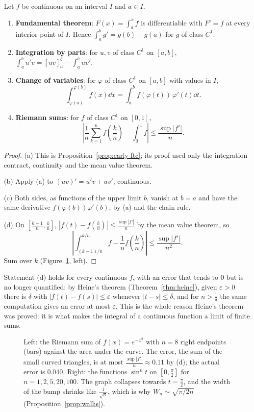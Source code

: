 \begin{proposition}\label{prop:inttools}
Let $f$ be continuous on an interval $I$ and $a\in I$.
\begin{enumerate}[label=(\alph*)]
\item \textbf{Fundamental theorem}: $F(x)=\int_a^xf$ is differentiable with $F'=f$ at every interior point of $I$. Hence $\int_a^bg'=g(b)-g(a)$ for $g$ of class $C^1$.
\item \textbf{Integration by parts}: for $u,v$ of class $C^1$ on $[a,b]$, $\int_a^bu'v=[uv]_a^b-\int_a^buv'$.
\item \textbf{Change of variables}: for $\varphi$ of class $C^1$ on $[a,b]$ with values in $I$,
\[\int_{\varphi(a)}^{\varphi(b)}f(x)\dd x=\int_a^bf(\varphi(t))\,\varphi'(t)\dd t.\]
\item \textbf{Riemann sums}: for $f$ of class $C^1$ on $[0,1]$,
\[\left|\frac1n\sum_{k=1}^nf\left(\frac kn\right)-\int_0^1f\right|\le\frac{\sup|f'|}{n}.\]
\end{enumerate}
\end{proposition}
\begin{proof}
(a) This is Proposition~\ref{prop:early-ftc}; its proof used only the
integration contract, continuity and the mean value theorem.

(b) Apply (a) to $(uv)'=u'v+uv'$, continuous.

(c) Both sides, as functions of the upper limit $b$, vanish at $b=a$ and have the same derivative $f(\varphi(b))\varphi'(b)$, by (a) and the chain rule.

(d) On $\left[\frac{k-1}n,\frac kn\right]$, $|f(t)-f(\frac kn)|\le\frac{\sup|f'|}n$ by the mean value theorem, so
\[\left|\int_{(k-1)/n}^{k/n}f-\frac1nf\left(\frac kn\right)\right|\le\frac{\sup|f'|}{n^2}.\]
Sum over $k$ (Figure~\ref{fig:riemannsum}, left).
\end{proof}

Statement (d) holds for every continuous $f$, with an error that tends to $0$ but is no longer quantified: by Heine's theorem (Theorem~\ref{thm:heine}), given $\varepsilon>0$ there is $\delta$ with $|f(t)-f(s)|\le\varepsilon$ whenever $|t-s|\le\delta$, and for $n>\frac1\delta$ the same computation gives an error at most $\varepsilon$. This is the whole reason Heine's theorem was proved: it is what makes the integral of a continuous function a limit of finite sums.

\begin{figure}[ht]
\centering
{}
\caption{Left: the Riemann sum of $f(x)=e^{-x^2}$ with $n=8$ right endpoints (bars) against the area under the curve. The error, the sum of the small curved triangles, is at most $\frac{\sup|f'|}n\approx0.11$ by (d); the actual error is $0.040$. Right: the functions $\sin^nt$ on $[0,\frac\pi2]$ for $n=1,2,5,20,100$. The graph collapses towards $t=\frac\pi2$, and the width of the bump shrinks like $\frac1{\sqrt n}$, which is why $W_n\sim\sqrt{\pi/2n}$ (Proposition~\ref{prop:wallis}).}
\label{fig:riemannsum}
\end{figure}

